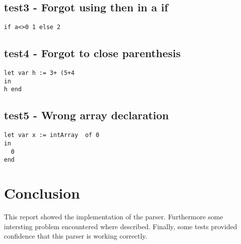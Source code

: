 \documentclass{article}
\begin{document}
\subsection{test3 - Forgot using then in a if}
\begin{lstlisting}[frame=single]
if a<>0 1 else 2
\end{lstlisting}


\subsection{test4 - Forgot to close parenthesis}
\begin{lstlisting}[frame=single]
let var h := 3+ (5+4
in
h end
\end{lstlisting}


\subsection{test5 - Wrong array declaration}


\begin{lstlisting}[frame=single]
let var x := intArray  of 0
in
  0
end
\end{lstlisting}


\section{Conclusion}
This report showed the implementation of the parser. Furthermore some intersting problem encountered where described. Finally, some tests provided confidence that this parser is working correctly.
\end{document}
